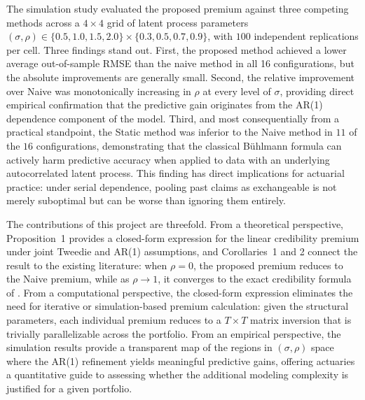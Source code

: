 \documentclass{sfuthesis}
\numberwithin{equation}{chapter}
\begin{document}
The simulation study evaluated the proposed premium against three
competing methods across a $4 \times 4$ grid of latent process
parameters $(\sigma, \rho) \in \{0.5, 1.0, 1.5, 2.0\} \times
\{0.3, 0.5, 0.7, 0.9\}$, with $100$ independent replications per cell.
Three findings stand out. First, the proposed method achieved a lower average out-of-sample RMSE than the naive method in all 16 configurations, but the absolute improvements are generally small. Second, the relative
improvement over Naive was monotonically increasing in $\rho$ at every
level of $\sigma$, providing direct empirical confirmation that the
predictive gain originates from the AR(1) dependence component of the
model. Third, and most consequentially from a practical standpoint, the
Static method was inferior to the Naive method in $11$ of the $16$
configurations, demonstrating that the classical Bühlmann formula can
actively harm predictive accuracy when applied to data with an
underlying autocorrelated latent process. This finding has direct
implications for actuarial practice: under serial dependence, pooling
past claims as exchangeable is not merely suboptimal but can be worse
than ignoring them entirely.


The contributions of this project are threefold. From a theoretical
perspective, Proposition~1 provides a closed-form expression for the linear
credibility premium under joint Tweedie and AR(1) assumptions, and
Corollaries~1 and 2 connect the result to the existing literature: when
$\rho = 0$, the proposed premium reduces to the Naive premium, while as
$\rho \to 1$, it converges to the exact credibility formula of
\citet{ohlsson2006exact}. From a computational
perspective, the closed-form expression eliminates the need for
iterative or simulation-based premium calculation: given the structural
parameters, each individual premium reduces to a $T \times T$
matrix inversion that is trivially parallelizable across the
portfolio. From an empirical perspective, the simulation results
provide a transparent map of the regions in $(\sigma, \rho)$ space where
the AR(1) refinement yields meaningful predictive gains, offering
actuaries a quantitative guide to assessing whether the additional
modeling complexity is justified for a given portfolio.
\end{document}
